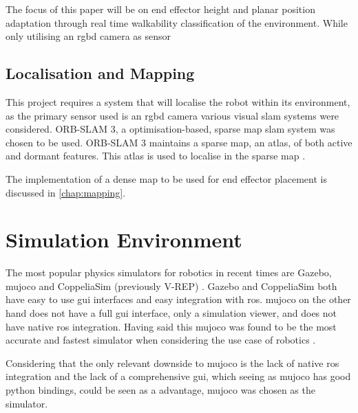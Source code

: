     The focus of this paper will be on end effector height and planar position adaptation through real time walkability classification of the environment. 
    While only utilising an \ac{rgbd} camera as sensor

    \subsection{Localisation and Mapping}

    This project requires a system that will localise the robot within its environment, as the primary sensor used is an \ac{rgbd} camera various visual \ac{slam} systems 
    were considered. ORB-SLAM 3, a optimisation-based, sparse map \ac{slam} system was chosen to be used. ORB-SLAM 3 maintains a sparse map, an atlas, of both active and
    dormant features. This atlas is used to localise in the sparse map \citep{macario2022comprehensive}.

    The implementation of a dense map to be used for end effector placement is discussed in \autoref{chap:mapping}.

\section{Simulation Environment}

The most popular physics simulators for robotics in recent times are Gazebo, \ac{mujoco} and CoppeliaSim (previously V-REP) \citep{Collins-2021}.
Gazebo and CoppeliaSim both have easy to use \ac{gui} interfaces and easy integration with \ac{ros}. \ac{mujoco} on the other hand does not have
a full \ac{gui} interface, only a simulation viewer, and does not have native \ac{ros} integration. Having said this \ac{mujoco} was found to be
the most accurate and fastest simulator when considering the use case of robotics \citep{Erez-2015}.

Considering that the only relevant downside to \ac{mujoco} is the lack of native \ac{ros} integration and the lack of a comprehensive \ac{gui},
which seeing as \ac{mujoco} has good python bindings, could be seen as a advantage, \ac{mujoco} was chosen as the simulator.
